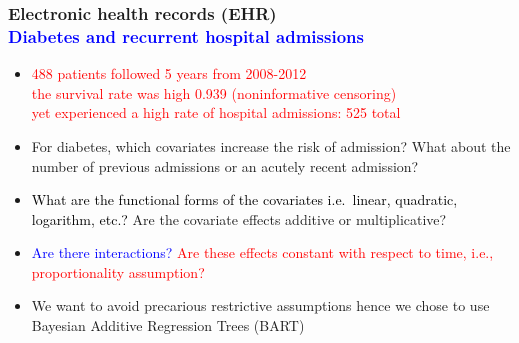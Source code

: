 \documentclass[11pt,pdftex,dvipsnames,usenames,helvetica]{beamer}
\begin{document}
\begin{frame}\frametitle{Electronic health records (EHR)\\
\textcolor{blue}{Diabetes and recurrent
      hospital admissions}}

\begin{itemize}
\item \textcolor{red}{488 patients followed 5 years from 2008-2012\\
the survival rate was high 0.939 (noninformative censoring)\\
yet experienced a high rate of hospital admissions: 525 total} %
\vspace*{0.1in}
\item For diabetes, which covariates increase the risk of admission?
What about the number of previous admissions or an acutely recent admission?
\vspace*{0.1in}
\item \textcolor{black}{What are the functional forms of the covariates
i.e.\ linear, quadratic, logarithm, etc.?}  Are the covariate effects
additive or multiplicative?
\vspace*{0.1in}
\item \textcolor{blue}{Are there interactions?}
 \textcolor{red}{Are these effects constant with respect to time, i.e., proportionality assumption?}
\item We want to avoid precarious restrictive assumptions
hence we chose to use Bayesian Additive Regression Trees (BART)
\end{itemize}

\end{frame}
\end{document}
